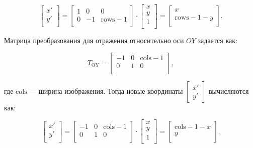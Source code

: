 \documentclass[a4paper,12pt]{article}
\begin{document}
\[
\begin{bmatrix}
x' \\
y' \\
\end{bmatrix}
= \begin{bmatrix}
1 & 0 & 0 \\
0 & -1 & \text{rows} - 1 \\
\end{bmatrix} \cdot
\begin{bmatrix}
x \\
y \\
1 \\
\end{bmatrix}
=
\begin{bmatrix}
x \\
\text{rows} - 1 - y \\
\end{bmatrix}.
\]

Матрица преобразования для отражения относительно оси \( OY \) задается как:

\[
T_{\text{OY}} = \begin{bmatrix}
-1 & 0 & \text{cols} - 1 \\
0 & 1 & 0 \\
\end{bmatrix},
\]

где \(\text{cols}\) — ширина изображения. Тогда новые координаты \( \begin{bmatrix} x' \\ y' \end{bmatrix} \) вычисляются как:

\[
\begin{bmatrix}
x' \\
y' \\
\end{bmatrix}
= \begin{bmatrix}
-1 & 0 & \text{cols} - 1 \\
0 & 1 & 0 \\
\end{bmatrix} \cdot
\begin{bmatrix}
x \\
y \\
1 \\
\end{bmatrix}
=
\begin{bmatrix}
\text{cols} - 1 - x \\
y \\
\end{bmatrix}.
\]
\end{document}
